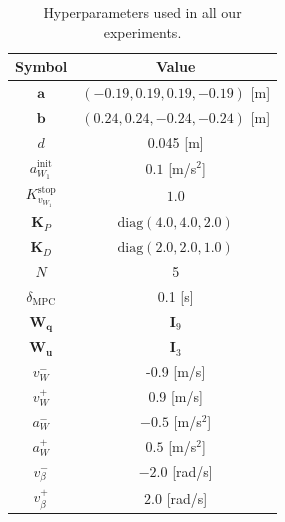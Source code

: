 \begin{table}
\centering
\begin{tabular}{ |c|c| } 
    \hline
    Symbol & Value \\
    \hline
    $\bm{a}$ & $(-0.19, 0.19, 0.19, -0.19)$ [m] \\
    $\bm{b}$ & $(0.24, 0.24, -0.24, -0.24)$ [m] \\
    $d$ & 0.045 [m] \\
    $a_{W_1}^{\mathrm{init}}$ & $0.1$ [m/s$^2$] \\ 
    $K_{v_{W_1}}^{\mathrm{stop}}$ & $1.0$ \\ 
    $\bm{K}_P$ & $\mathrm{diag}(4.0, 4.0, 2.0)$ \\ 
    $\bm{K}_D$ & $\mathrm{diag}(2.0, 2.0, 1.0)$ \\ 
    $N$ & 5 \\
    $\delta_{\mathrm{MPC}}$ & 0.1 [s] \\
    $\bm{W_q}$ & $\bm{I}_9$ \\ 
    $\bm{W_u}$ & $\bm{I}_3$ \\
    $v_W^-$ & -0.9 [m/s] \\
    $v_W^+$ & 0.9 [m/s] \\
    $a_W^-$ & $-0.5$ [m/s$^2$] \\ 
    $a_W^+$ & $0.5$ [m/s$^2$] \\ 
    $v_{\beta}^-$ & $-2.0$ [rad/s] \\ 
    $v_{\beta}^+$ & $2.0$ [rad/s] \\ 
    \hline
\end{tabular}
\caption{Hyperparameters used in all our experiments.}
\label{tab:hyperparameters}
\end{table}

